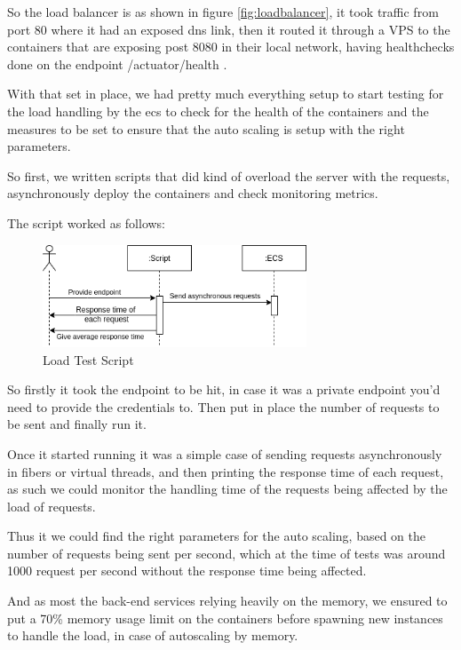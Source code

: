 So the load balancer is as shown in figure \ref{fig:loadbalancer}, it took traffic from
port 80 where it had an exposed dns link, then it routed it through a VPS to the
containers that are exposing post 8080 in their local network, having healthchecks
done on the endpoint /actuator/health .

\newpage

With that set in place, we had pretty much everything setup to start testing for the
load handling by the ecs to check for the health of the containers and the measures
to be set to ensure that the auto scaling is setup with the right parameters.

So first, we written scripts that did kind of overload the server with the requests,
asynchronously deploy the containers and check monitoring metrics.


The script worked as follows:

\begin{figure}[!htbp]
    \centering
    \includegraphics[width=0.7\textwidth]{images/scriptdos.png}
    \caption{\footnotesize{Load Test Script}}
    \label{fig:loadtest}
\end{figure}

So firstly it took the endpoint to be hit, in case it was a private endpoint you'd need to
provide the credentials to. Then put in place the number of requests to be sent and
finally run it.

Once it started running it was a simple case of sending requests asynchronously in fibers
or virtual threads, and then printing the response time of each request, as such we could
monitor the handling time of the requests being affected by the load of requests.

Thus it we could find the right parameters for the auto scaling, based on the number of
requests being sent per second, which at the time of tests was around 1000 request per
second without the response time being affected.

And as most the back-end services relying heavily on the memory, we ensured to put a 70\%
memory usage limit on the containers before spawning new instances to handle the load, in
case of autoscaling by memory.


